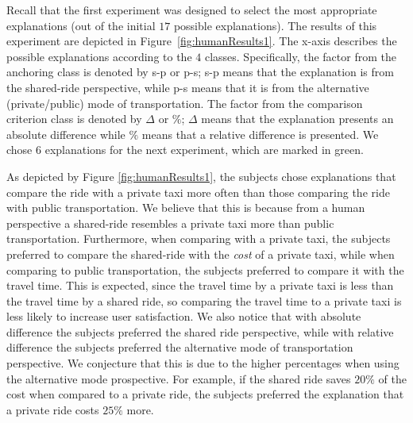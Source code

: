\documentclass[letterpaper]{article} %
\begin{document}
Recall that the first experiment was designed to select the most appropriate explanations (out of the initial $17$ possible explanations). The results of this experiment are depicted in Figure~\ref{fig:humanResults1}. The x-axis describes the possible explanations according to the $4$ classes. Specifically, the factor from the anchoring class is denoted by s-p or p-s; s-p means that the explanation is from the shared-ride perspective, while p-s means that it is from the alternative (private/public) mode of transportation. The factor from the comparison criterion class is denoted by $\Delta$ or $\%$; $\Delta$ means that the explanation presents an absolute difference while $\%$ means that a relative difference is presented. We chose $6$ explanations for the next experiment, which are marked in green.



As depicted by Figure \ref{fig:humanResults1}, the subjects chose explanations that compare the ride with a private taxi more often than those comparing the ride with public transportation. We believe that this is because from a human perspective a shared-ride resembles a private taxi more than public transportation.
Furthermore, when comparing with a private taxi, the subjects preferred to compare the shared-ride with the \emph{cost} of a private taxi, while when comparing to public transportation, the subjects preferred to compare it with the travel time. This is expected, since the travel time by a private taxi is less than the travel time by a shared ride, so comparing the travel time to a private taxi is less likely to increase user satisfaction.
We also notice that with absolute difference the subjects preferred the shared ride perspective, while with relative difference the subjects preferred the alternative mode of transportation perspective. We conjecture that this is due to the higher percentages when using the alternative mode prospective. For example, if the shared ride saves $20\%$ of the cost when compared to a private ride, the subjects preferred the explanation that a private ride costs $25\%$ more.
\end{document}
